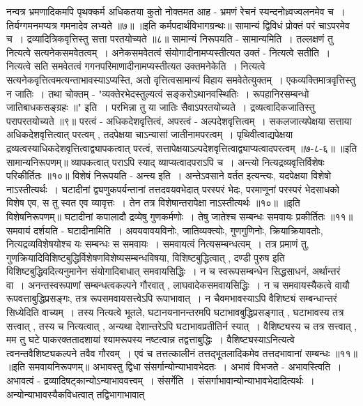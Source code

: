 नन्वत्र भ्रमणादिकमपि पृथक्कर्म अधिकतया कुतो नोक्तमत आह -
भ्रमणं रेचनं स्यन्दनोध्र्वज्वलनमेव च~।
तिर्यग्गमनमप्यत्र गमनादेव लभ्यते ॥७॥
॥इति कर्मपदार्थविभागग्रन्थः॥
सामान्यं द्विविधं प्रोक्तं परं चाऽपरमेव च~।
द्रव्यादित्रिकवृत्तिस्तु सत्ता परतयोच्यते ॥८॥
सामान्यं निरूपयति - सामान्यमिति~। तल्लक्षणं तु नित्यत्वे सत्यनेकसमवेतत्वम्~। अनेकसमवेतत्वं संयोगादीनामप्यस्तीत्यत उक्तं - नित्यत्वे सतीति~। नित्यत्वे सति
समवेतत्वं गगनपरिमाणादीनामप्यस्तीत्यत उक्तमनेकेति~। नित्यत्वे सत्यनेकवृत्तित्वमत्यन्ताभावस्याऽप्यस्ति, अतो वृत्तित्वसामान्यं विहाय समवेतेत्युक्तम्~।
एकव्यक्तिमात्रवृत्तिस्तु न जातिः~। तथा चोक्तम् -
"व्यक्तेरभेदस्तुल्यत्वं सङ्करोऽथानवस्थितिः~।
रूपहानिरसम्बन्धो जातिबाधकसङ्ग्रहः ॥" इति~।
परभिन्ना तु या जातिः सैवाऽपरतयोच्यते~।
द्रव्यत्वादिकजातिस्तु परापरतयोच्यते ॥९॥
परत्वं - अधिकदेशवृत्तित्वं, अपरत्वं - अल्पदेशवृत्तित्वम्~। सकलजात्यपेक्षया सत्ताया अधिकदेशवृत्तित्वात् परत्वम् , तदपेक्षया चाऽन्यासां जातीनामपरत्वम्~। पृथिवीत्वाद्यपेक्षया
द्रव्यत्वस्याधिकदेशवृत्तित्वाद्व्यापकत्वात् परत्वं, सत्तापेक्षयाऽल्पदेशवृत्तित्वाद्व्याप्यत्वादपरत्वम् ॥७-८-६॥
॥इति सामान्यनिरूपणम्॥
व्यापकत्वात् पराऽपि स्याद् व्याप्यत्वादपराऽपि च~।
अन्त्यो नित्यद्रव्यवृत्तिर्विशेषः परिकीर्तितः ॥१०॥
विशेषं निरूपयति - अन्त्य इति~। अन्तेऽवसाने वर्तत इत्यन्त्यः, यदपेक्षया विशेषो नाऽस्तीत्यर्थः~। घटादीनां द्व्यणुकपर्यन्तानां तत्तदवयवभेदात् परस्परं भेदः,
परमाणूनां परस्परं भेदसाधको विशेष एव, स तु स्वत एव व्यावृत्तः~। तेन तत्र विशेषान्तरापेक्षा नाऽस्तीत्यर्थः ॥१०॥
॥इति विशेषनिरूपणम्॥
घटादीनां कपालादौ द्रव्येषु गुणकर्मणोः~।
तेषु जातेश्च सम्बन्धः समवायः प्रकीर्तितः ॥११॥
समवायं दर्शयति - घटादीनामिति~। अवयवावयविनोः, जातिव्यक्त्योः, गुणगुणिनोः, क्रियाक्रियावतोः, नित्यद्रव्यविशेषयोश्च यः सम्बन्धः स समवायः~।
समवायत्वं नित्यसम्बन्धत्वम्~। तत्र प्रमाणं तु, गुणक्रियादिविशिष्टबुद्धिर्विशेषणविशेष्यसम्बन्धविषया, विशिष्टबुद्धित्वात् , दण्डी पुरुष इति विशिष्टबुद्धिवदित्यनुमानेन
संयोगादिबाधात् समवायसिद्धिः~। न च स्वरूपसम्बन्धेन सिद्धसाधनं, अर्थान्तरं वा~। अनन्तस्वरूपाणां सम्बन्धत्वकल्पने गौरवात् , लाघवादेकसमवायसिद्धिः~।
न च समवायस्यैकत्वे वायौ रूपवत्ताबुद्धिप्रसङ्गः, तत्र रूपसमवायसत्त्वेऽपि रूपाभावात्~।
न चैवमभावस्याऽपि वैशिष्ट्यं सम्बन्धान्तरं सिध्येदिति वाच्यम्~। तस्य नित्यत्वे भूतले, घटानयनानन्तरमपि घटाभावबुद्धिप्रसङ्गात् , घटाभावस्य तत्र सत्त्वात् ,
तस्य च नित्यत्वात् , अन्यथा देशान्तरेऽपि घटाभावप्रतीतिर्न स्यात्~। वैशिष्ट्यस्य च तत्र सत्त्वात् , मम तु घटे पाकरक्ततादशायां श्यामरूपस्य नष्टत्वान्न तद्वत्ताबुद्धिः~।
वैशिष्ट्यस्याऽनित्यत्वे त्वनन्तवैशिष्ट्यकल्पने तवैव गौरवम्~। एवं च तत्तत्कालीनं तत्तद्भूतलादिकमेव तत्तदभावानां सम्बन्धः ॥११॥
॥इति समवायनिरूपणम्॥
अभावस्तु द्विधा संसर्गान्योन्याभावभेदतः~।
अभावं विभजते - अभावस्त्विति~। अभावत्वं - द्रव्यादिषट्कान्योऽन्याभाववत्त्वम्~। संसर्गेति~। संसर्गाभावान्योन्याभावभेदादित्यर्थः~। अन्योन्याभावस्यैकविधत्वात् तद्विभागाभावात्
